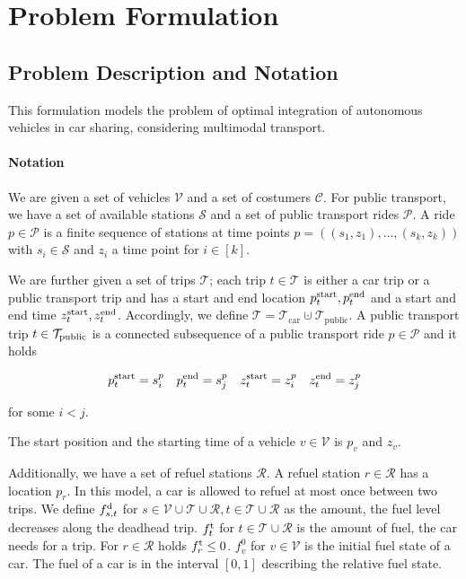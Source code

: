 \section{Problem Formulation}

\subsection{Problem Description and Notation}

This formulation models the problem of optimal integration of autonomous vehicles in car sharing, considering multimodal transport.

\paragraph{Notation} \parfill

We are given a set of vehicles $\mathcal{V}$ and a set of costumers $\mathcal{C}$. For public transport, we have a set of available stations $\mathcal{S}$ and a set of public transport rides $\mathcal{P}$. A ride $p\in \mathcal{P}$ is a finite sequence of stations at time points $p=\left(\left(s_1,z_1\right),\dots,\left(s_k,z_k\right)\right)$ with $s_i\in\mathcal{S}$ and $z_i$ a time point for $i\in[k]$. 

We are further given a set of trips $\mathcal{T}$; each trip $t\in\mathcal{T}$ is either a car trip or a public transport trip and has a start and end location $p^{\operatorname{start}}_t, p^{\operatorname{end}}_t$ and a start and end time $z^{\operatorname{start}}_t, z^{\operatorname{end}}_t$. Accordingly, we define $\mathcal{T} = \mathcal{T}_{\operatorname{car}}\cupdot\mathcal{T}_{\operatorname{public}}$. A public transport trip $t\in\mathcal{T}_{\operatorname{public}}$ is a connected subsequence of a public transport ride $p\in\mathcal{P}$ and it holds

\begin{align*}
	p^{\operatorname{start}}_t = s^p_i & &  p^{\operatorname{end}}_t = s^p_j & & z^{\operatorname{start}}_t = z^p_i & & z^{\operatorname{end}}_t = z^p_j
\end{align*}

for some $i<j$.

The start position and the starting time of a vehicle $v\in\mathcal{V}$ is $p_v$ and $z_v$.

Additionally, we have a set of refuel stations $\mathcal{R}$. A refuel station $r\in\mathcal{R}$ has a location $p_r$. In this model, a car is allowed to refuel at most once between two trips. We define $f^{\operatorname{d}}_{s,t}$ for $s\in\mathcal{V}\cup\mathcal{T}\cup\mathcal{R},t\in\mathcal{T}\cup\mathcal{R}$ as the amount, the fuel level decreases along the deadhead trip. $f^{\operatorname{t}}_t$ for $t\in\mathcal{T}\cup\mathcal{R}$ is the amount of fuel, the car needs for a trip. For $r\in\mathcal{R}$ holds $f^{\operatorname{t}}_r \leq 0$. $f^0_v$ for $v\in\mathcal{V}$ is the initial fuel state of a car. The fuel of a car is in the interval $[0,1]$ describing the relative fuel state.

